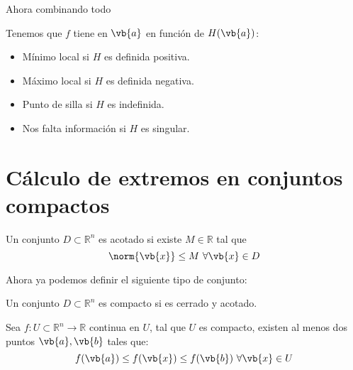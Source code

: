 \documentclass{../Calculo.tex}
\begin{document}
Ahora combinando todo
\begin{teorema}
Tenemos que $f$ tiene en $\vb{a}$ en función de $H(\vb{a})$:  
\begin{itemize}
	\item Mínimo local si $H$ es definida positiva.
	\item Máximo local si $H$ es definida negativa.
	\item Punto de silla si $H$ es indefinida.
	\item Nos falta información si $H$ es singular. 
\end{itemize}

\end{teorema}
\pagebreak
\section{Cálculo de extremos en conjuntos compactos}
\begin{defin}
Un conjunto $D \subset \mathbb{R}^{n}$ es acotado si existe $M \in \mathbb{R}$ tal que
\[
	\norm{\vb{x}} \leq M ~ \forall \vb{x} \in D
\]
\end{defin}
Ahora ya podemos definir el siguiente tipo de conjunto:
\begin{defin}
Un conjunto $D \subset \mathbb{R}^{n}$ es compacto si es cerrado y acotado. 
\end{defin}
\begin{teorema}
	Sea $f: U \subset \mathbb{R}^{n} \to \mathbb{R}$ continua en $U$, tal que $U$ es compacto, existen al menos dos puntos $\vb{a}, \vb{b}$ tales que:
	\[
		f(\vb{a}) \leq f(\vb{x}) \leq f(\vb{b}) ~\forall \vb{x} \in U
	\]
\end{teorema}
\end{document}
